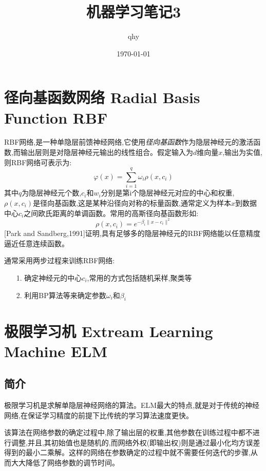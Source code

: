 \documentclass[UTF8,a4paper]{ctexart}%
\author{qhy}%
\title{机器学习笔记3}%
\date{\today}%
\begin{document}
  \maketitle
  \tableofcontents
  \newpage
  \section{径向基函数网络 Radial Basis Function RBF\color{red}{(样本中心$c_i$这个还需要看一看)}}
    RBF网络,是一种单隐层前馈神经网络,它使用\emph{径向基函数}作为隐层神经元的激活函数,而输出层则是对隐层神经元输出的线性组合。假定输入为$d$维向量$x$,输出为实值,则RBF网络可表示为:
    \begin{equation}
      \varphi(x) = \sum_{i = 1}^q \omega_i \rho(x,c_i)
    \end{equation}
    其中$q$为隐层神经元个数,$c_i$和$w_i$分别是第i个隐层神经元对应的中心和权重,$\rho(x,c_i)$是径向基函数,这是某种沿径向对称的标量函数,通常定义为样本$x$到数据中心$c_i$之间欧氏距离的单调函数。常用的高斯径向基函数形如:
    \begin{equation}
      \rho(x,c_i) = e^{-\beta_i\|x-c_i\|^2}
    \end{equation}
    [Park and Sandberg,1991]证明,具有足够多的隐层神经元的RBF网络能以任意精度逼近任意连续函数。

    通常采用两步过程来训练RBF网络:
    \begin{itemize}
      \item [1.] 确定神经元的中心$c_i$,常用的方式包括随机采样,聚类等
      \item [2.] 利用BP算法等来确定参数$\omega_i$和$\beta_i$
    \end{itemize}

  \section{极限学习机 Extream Learning Machine ELM}

      \subsection{简介}

          极限学习机是求解单隐层神经网络的算法。ELM最大的特点,就是对于传统的神经网络,在保证学习精度的前提下比传统的学习算法速度更快。

          该算法在网络参数的确定过程中,除了输出层的权重,其他参数在训练过程中都不进行调整,并且,其初始值也是随机的,而网络外权(即输出权)则是通过最小化均方误差得到的最小二乘解。这样的网络在参数确定的过程中就不需要任何迭代的步骤,从而大大降低了网络参数的调节时间。
\end{document}
